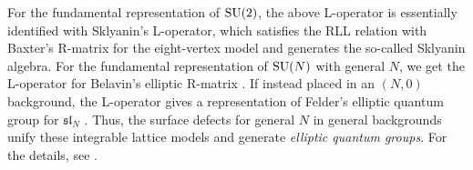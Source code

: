 For the fundamental representation of $\mathrm{SU}(2)$, the above L-operator
is essentially identified with Sklyanin's L-operator, which satisfies
the RLL relation with Baxter's R-matrix for the eight-vertex model
and generates the so-called Sklyanin algebra. For the fundamental
representation of $\mathrm{SU}(N)$ with general $N$, we get the L-operator
for Belavin's elliptic R-matrix \cite{Belavin:1981ix}. If instead placed in
an $( N,0 )$ background, the L-operator gives a representation
of Felder's elliptic quantum group for $\mathfrak{sl}_{N}$ \cite{Felder:1994pb,Felder:1994be,MR1606760}.
Thus, the surface defects for general $N$ in general backgrounds
unify these integrable lattice models and
generate \emph{elliptic quantum groups}.
For the details, see \cite{Yagi:2017hmj}.










